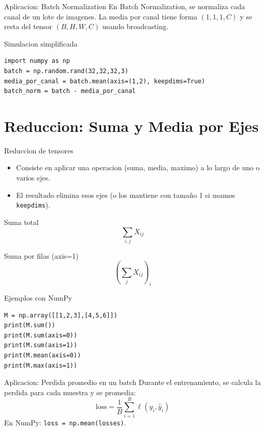 \documentclass[aspectratio=169, 10pt, xcolor=table]{beamer}
\begin{document}
\begin{frame}[fragile]{Aplicacion: Batch Normalization}
    En Batch Normalization, se normaliza cada canal de un lote de imagenes. La media por canal tiene forma $(1,1,1,C)$ y se resta del tensor $(B,H,W,C)$ usando broadcasting.
    
    \begin{exampleblock}{Simulacion simplificada}
\begin{lstlisting}
import numpy as np
batch = np.random.rand(32,32,32,3)
media_por_canal = batch.mean(axis=(1,2), keepdims=True)
batch_norm = batch - media_por_canal
\end{lstlisting}
    \end{exampleblock}
\end{frame}

\section{Reduccion: Suma y Media por Ejes}

\begin{frame}{Reduccion de tensores}
    \begin{itemize}
        \item Consiste en aplicar una operacion (suma, media, maximo) a lo largo de uno o varios ejes.
        \item El resultado elimina esos ejes (o los mantiene con tamaño 1 si usamos \texttt{keepdims}).
    \end{itemize}
    \begin{block}{Suma total}
        \[ \sum_{i,j} X_{ij} \]
    \end{block}
    \begin{block}{Suma por filas (axis=1)}
        \[ (\sum_{j} X_{ij})_i \]
    \end{block}
\end{frame}

\begin{frame}[fragile]{Ejemplos con NumPy}
\begin{lstlisting}
M = np.array([[1,2,3],[4,5,6]])
print(M.sum())
print(M.sum(axis=0))
print(M.sum(axis=1))
print(M.mean(axis=0))
print(M.max(axis=1))
\end{lstlisting}
\end{frame}

\begin{frame}{Aplicacion: Perdida promedio en un batch}
    Durante el entrenamiento, se calcula la perdida para cada muestra y se promedia:
    \[ \text{loss} = \frac{1}{B}\sum_{i=1}^{B} \ell(y_i, \hat{y}_i) \]
    En NumPy: \texttt{loss = np.mean(losses)}.
\end{frame}
\end{document}
